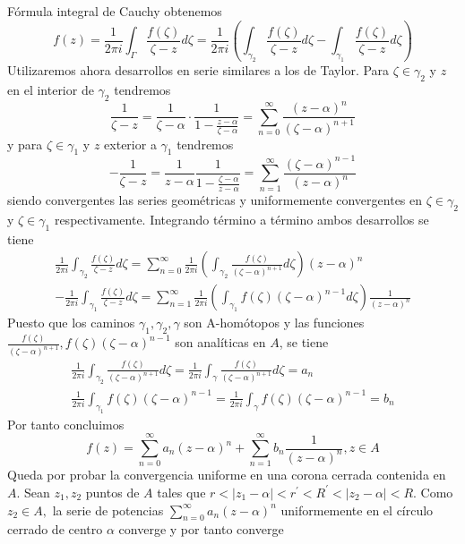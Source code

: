 \documentclass[a4paper, 11pt]{extarticle}
\begin{document}
\begin{multicols*}{2}
{Fórmula integral de Cauchy obtenemos
$$
f(z) =\frac{1}{2 \pi i} \int_{\Gamma} \frac{f(\zeta)}{\zeta-z} d \zeta 
=\frac{1}{2 \pi i} \left( \int_{\gamma_{2}} \frac{f(\zeta)}{\zeta-z} d \zeta- \int_{\gamma_{1}} \frac{f(\zeta)}{\zeta-z} d \zeta \right)
$$
Utilizaremos ahora desarrollos en serie similares a los de Taylor. 
Para $\zeta \in \gamma_{2}$ y $z$ en el interior de $\gamma_{2}$ tendremos
$$
\frac{1}{\zeta-z}=\frac{1}{\zeta-\alpha} \cdot \frac{1}{1-\frac{z-\alpha}{\zeta-\alpha}}=\sum_{n=0}^{\infty} \frac{(z-\alpha)^{n}}{(\zeta-\alpha)^{n+1}}
$$
y para $\zeta \in \gamma_{1}$ y $z$ exterior a $\gamma_{1}$ tendremos
$$
-\frac{1}{\zeta-z}=\frac{1}{z-\alpha} \frac{1}{1-\frac{\zeta-\alpha}{z-\alpha}}=\sum_{n=1}^{\infty} \frac{(\zeta-\alpha)^{n-1}}{(z-\alpha)^{n}}
$$
siendo convergentes las series geométricas y 
uniformemente convergentes en $\zeta \in \gamma_{2}$ y $\zeta \in \gamma_{1}$ respectivamente.
Integrando término a término ambos desarrollos se tiene
$$
\begin{array}{c}
\frac{1}{2 \pi i} \int_{\gamma_{2}} \frac{f(\zeta)}{\zeta-z} d \zeta=\sum_{n=0}^{\infty} \frac{1}{2 \pi i}\left(\int_{\gamma_{2}} 
\frac{f(\zeta)}{(\zeta-\alpha)^{n+1}} d \zeta\right)(z-\alpha)^{n} \\
-\frac{1}{2 \pi i} \int_{\gamma_{1}} \frac{f(\zeta)}{\zeta-z} d \zeta=\sum_{n=1}^{\infty} \frac{1}{2 \pi i}\left(\int_{\gamma_{1}}
 f(\zeta)(\zeta-\alpha)^{n-1} d \zeta\right) \frac{1}{(z-\alpha)^{n}}
\end{array}
$$
Puesto que los caminos $\gamma_{1}, \gamma_{2}, \gamma$ son A-homótopos y las funciones
$\frac{f(\zeta)}{(\zeta-\alpha)^{n+1}}, f(\zeta)(\zeta-\alpha)^{n-1}$
son analíticas en $A$, se tiene
$$
\begin{array}{c}
\frac{1}{2 \pi i} \int_{\gamma_{2}} \frac{f(\zeta)}{(\zeta-\alpha)^{n+1}} d \zeta=\frac{1}{2 \pi i} \int_{\gamma} \frac{f(\zeta)}{(\zeta-\alpha)^{n+1}} d \zeta=a_{n} \\
\frac{1}{2 \pi i} \int_{\gamma_{1}} f(\zeta)(\zeta-\alpha)^{n-1}=\frac{1}{2 \pi i} \int_{\gamma} f(\zeta)(\zeta-\alpha)^{n-1}=b_{n}
\end{array}
$$
Por tanto concluimos
$$
f(z)=\sum_{n=0}^{\infty} a_{n}(z-\alpha)^{n}+\sum_{n=1}^{\infty} b_{n} \frac{1}{(z-\alpha)^{n}}, z \in A
$$
Queda por probar la convergencia uniforme en una corona cerrada contenida en $A$.
Sean $z_{1}, z_{2}$ puntos de $A$ tales que
$r<\left|z_{1}-\alpha\right|<r^{\prime}<R^{\prime}<\left|z_{2}-\alpha\right|<R$.
Como $z_{2} \in A,$ la serie de potencias
$\sum_{n=0}^{\infty} a_{n}(z-\alpha)^{n}$
uniformemente en el círculo cerrado de centro $\alpha$ converge y por tanto converge
}
\end{multicols*}
\end{document}

